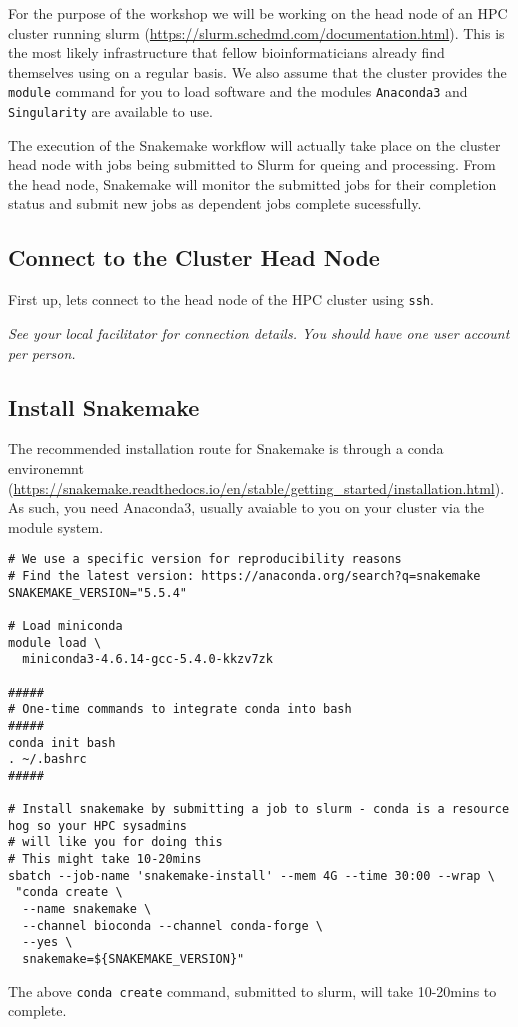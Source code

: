 For the purpose of the workshop we will be working on the head node of an HPC cluster running slurm (\url{https://slurm.schedmd.com/documentation.html}).
This is the most likely infrastructure that fellow bioinformaticians already find themselves using
on a regular basis. We also assume that the cluster provides the \texttt{module} command for you to
load software and the modules \texttt{Anaconda3} and \texttt{Singularity} are available to use.

The execution of the Snakemake workflow will actually take place on the cluster head node with jobs
being submitted to Slurm for queing and processing. From the head node, Snakemake will monitor the
submitted jobs for their completion status and submit new jobs as dependent jobs complete sucessfully.

\subsection{Connect to the Cluster Head Node}

\begin{steps}
First up, lets connect to the head node of the HPC cluster using \texttt{ssh}.

\emph{See your local facilitator for connection details. You should have one user account per person.}
\end{steps}

\subsection{Install Snakemake}

The recommended installation route for Snakemake is through a conda environemnt
(\url{https://snakemake.readthedocs.io/en/stable/getting_started/installation.html}). As such, you need
Anaconda3, usually avaiable to you on your cluster via the module system.

\begin{steps}
\begin{lstlisting}
# We use a specific version for reproducibility reasons
# Find the latest version: https://anaconda.org/search?q=snakemake
SNAKEMAKE_VERSION="5.5.4"

# Load miniconda
module load \
  miniconda3-4.6.14-gcc-5.4.0-kkzv7zk

#####
# One-time commands to integrate conda into bash
#####
conda init bash
. ~/.bashrc
#####

# Install snakemake by submitting a job to slurm - conda is a resource hog so your HPC sysadmins
# will like you for doing this
# This might take 10-20mins
sbatch --job-name 'snakemake-install' --mem 4G --time 30:00 --wrap \
 "conda create \
  --name snakemake \
  --channel bioconda --channel conda-forge \
  --yes \
  snakemake=${SNAKEMAKE_VERSION}"
\end{lstlisting}

The above \texttt{conda create} command, submitted to slurm, will take 10-20mins to complete. 

\end{steps}

